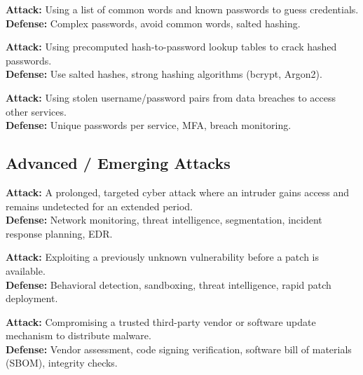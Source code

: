 \documentclass[11pt,a4paper]{article}
\begin{document}
\begin{alertbox}
\textbf{Attack:} Using a list of common words and known passwords to guess credentials.\\
\textbf{Defense:} Complex passwords, avoid common words, salted hashing.
\end{alertbox}

\begin{alertbox}
\textbf{Attack:} Using precomputed hash-to-password lookup tables to crack hashed passwords.\\
\textbf{Defense:} Use salted hashes, strong hashing algorithms (bcrypt, Argon2).
\end{alertbox}

\begin{alertbox}
\textbf{Attack:} Using stolen username/password pairs from data breaches to access other services.\\
\textbf{Defense:} Unique passwords per service, MFA, breach monitoring.
\end{alertbox}

\subsection{Advanced / Emerging Attacks}

\begin{alertbox}
\textbf{Attack:} A prolonged, targeted cyber attack where an intruder gains access and remains undetected for an extended period.\\
\textbf{Defense:} Network monitoring, threat intelligence, segmentation, incident response planning, EDR.
\end{alertbox}

\begin{alertbox}
\textbf{Attack:} Exploiting a previously unknown vulnerability before a patch is available.\\
\textbf{Defense:} Behavioral detection, sandboxing, threat intelligence, rapid patch deployment.
\end{alertbox}

\begin{alertbox}
\textbf{Attack:} Compromising a trusted third-party vendor or software update mechanism to distribute malware.\\
\textbf{Defense:} Vendor assessment, code signing verification, software bill of materials (SBOM), integrity checks.
\end{alertbox}
\end{document}
